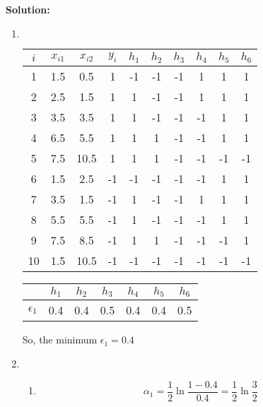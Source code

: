\documentclass[10pt]{article}
\begin{document}
\begin{enumerate}[1.]
\begin{itemize}
\begin{enumerate}
		        \end{enumerate}
        \end{itemize}
		\textbf{Solution:}
        \begin{enumerate}
            \item 
            $$$$
            \begin{center}
                \begin{tabular}{|c|cc|c|cccccc|}
                \hline
                $i$ & $x_{i1}$ & $x_{i2}$ & $y_{i}$ & $h_1$ & $h_2$ & $h_3$ & $h_4$ & $h_5$ & $h_6$ \\ \hline
                1 & 1.5 & 0.5 & 1 & -1 & -1 & -1 & 1 & 1 & 1\\
                2 & 2.5 & 1.5 & 1 & 1& -1& -1& 1& 1& 1 \\
                3 & 3.5 & 3.5 & 1 & 1& -1& -1& -1& 1& 1 \\
                4 & 6.5 & 5.5 & 1 & 1& 1& -1& -1& 1& 1 \\
                5 & 7.5 & 10.5 & 1 & 1& 1& -1& -1& -1& -1 \\
                6 & 1.5 & 2.5 & -1 & -1& -1& -1& -1& 1& 1 \\
                7 & 3.5 & 1.5 & -1 & 1& -1& -1& 1& 1& 1 \\
                8 & 5.5 & 5.5 & -1 & 1& -1& -1& -1& 1&  1\\
                9 & 7.5 & 8.5 & -1 & 1& 1& -1& -1& -1& 1 \\
                10 & 1.5 & 10.5 & -1 & -1& -1& -1& -1& -1& -1\\
                \hline
                \end{tabular}
            \end{center}
            \begin{center}
                \begin{tabular}{|c|cccccc|}
                \hline
                 &$h_1$&$h_2$&$h_3$&$h_4$&$h_5$&$h_6$\\
                \hline
                $\epsilon_1$&0.4&0.4&0.5&0.4&0.4&0.5\\
                \hline
                \end{tabular}
            \end{center}
            So, the minimum $\epsilon_1=0.4$
            \item 
            \begin{enumerate}[(1)]
                \item 
                $$\alpha_1=\frac{1}{2}\ln\frac{1-0.4}{0.4}=\frac12\ln\frac32$$

\end{enumerate}
\end{enumerate}
\end{enumerate}
\end{document}
